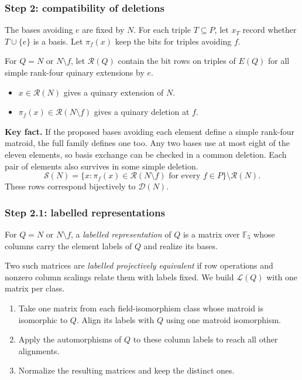\documentclass{beamer}
\newcommand{\F}{\mathbb{F}}
\newcommand{\RR}{\mathcal R}
\begin{document}
\begin{frame}
  \frametitle{Step 2: compatibility of deletions}
  The bases avoiding $e$ are fixed by $N$. For each triple $T\subseteq P$,
  let $x_T$ record whether $T\cup\{e\}$ is a basis. Let $\pi_f(x)$ keep
  the bits for triples avoiding $f$.

  \medskip
  For $Q=N$ or $N\setminus f$, let $\RR(Q)$ contain the bit rows on
  triples of $E(Q)$ for all simple rank-four quinary extensions by $e$.
  \begin{itemize}
    \item $x\in\RR(N)$ gives a quinary extension of $N$.
    \item $\pi_f(x)\in\RR(N\setminus f)$ gives a quinary deletion at $f$.
  \end{itemize}

  \textbf{Key fact.} If the proposed bases avoiding each element define
  a simple rank-four matroid, the full family defines one too.
  Any two bases use at most eight of the eleven elements, so basis
  exchange can be checked in a common deletion. Each pair of elements
  also survives in some simple deletion.
  \[
    \mathcal S(N)=
    \{x:\pi_f(x)\in\RR(N\setminus f)\text{ for every }f\in P\}
    \setminus\RR(N).
  \]
  These rows correspond bijectively to $\mathcal D(N)$.
\end{frame}

\begin{frame}
  \frametitle{Step 2.1: labelled representations}
  For $Q=N$ or $N\setminus f$, a \emph{labelled representation} of
  $Q$ is a matrix over $\F_5$ whose columns carry the element labels
  of $Q$ and realize its bases.

  \medskip
  Two such matrices are \emph{labelled projectively equivalent}
  if row operations and nonzero column scalings relate them with
  labels fixed. We build $\mathcal L(Q)$ with one matrix per class.
  \begin{enumerate}
    \item Take one matrix from each field-isomorphism class whose
      matroid is isomorphic to $Q$. Align its labels with $Q$ using
      one matroid isomorphism.
    \item Apply the automorphisms of $Q$ to these column labels to
      reach all other alignments.
    \item Normalize the resulting matrices and keep the distinct ones.
  \end{enumerate}
\end{frame}
\end{document}
